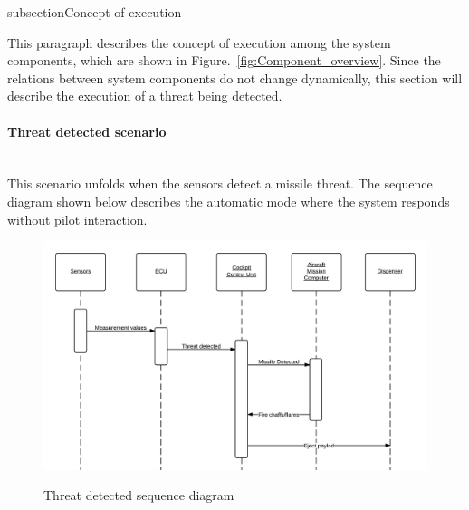 subsection{Concept of execution}

This paragraph describes the concept of execution among the system components, which are shown in Figure.~\ref{fig:Component_overview}. Since the relations between system 
components do not change dynamically, this section will describe the execution of a threat being detected.

\paragraph{Threat detected scenario}\mbox{}\\
This scenario unfolds when the sensors detect a missile threat. The sequence diagram shown below describes the automatic mode where the system responds without pilot 
interaction.

\begin{figure}[h]
	\centering
	\includegraphics[scale=0.15]{./images/threatDetectedSequenceDiagram.png}\\
	\caption{Threat detected sequence diagram}
    \label{fig:threatDetectedSeqDia}
\end{figure}

